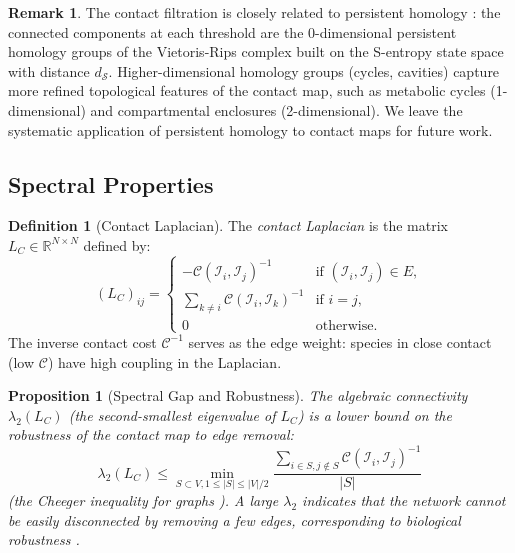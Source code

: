 \documentclass[11pt,twocolumn]{article}
\theoremstyle{plain}
\newtheorem{proposition}[theorem]{Proposition}
\theoremstyle{definition}
\newtheorem{definition}[theorem]{Definition}
\newtheorem{remark}[theorem]{Remark}
\newcommand{\CC}{\mathcal{C}}
\newcommand{\dS}{d_{\mathcal{S}}}
\newcommand{\reals}{\mathbb{R}}
\begin{document}
\begin{remark}
The contact filtration is closely related to persistent homology
\cite{edelsbrunner2008persistent, carlsson2009topology}: the connected
components at each threshold are the 0-dimensional persistent homology groups
of the Vietoris-Rips complex built on the S-entropy state space with distance
$\dS$. Higher-dimensional homology groups (cycles, cavities) capture more
refined topological features of the contact map, such as metabolic cycles
(1-dimensional) and compartmental enclosures (2-dimensional). We leave the
systematic application of persistent homology to contact maps for future work.
\end{remark}

\subsection{Spectral Properties}

\begin{definition}[Contact Laplacian]
\label{def:laplacian}
The \emph{contact Laplacian} is the matrix $L_C \in \reals^{N \times N}$
defined by:
\begin{equation}\label{eq:laplacian}
  (L_C)_{ij} =
  \begin{cases}
    -\CC(\mathcal{I}_i, \mathcal{I}_j)^{-1}
      & \text{if } (\mathcal{I}_i, \mathcal{I}_j) \in E, \\
    \sum_{k \neq i} \CC(\mathcal{I}_i, \mathcal{I}_k)^{-1}
      & \text{if } i = j, \\
    0 & \text{otherwise}.
  \end{cases}
\end{equation}
The inverse contact cost $\CC^{-1}$ serves as the edge weight: species in close
contact (low $\CC$) have high coupling in the Laplacian.
\end{definition}

\begin{proposition}[Spectral Gap and Robustness]
\label{prop:spectral_gap}
The algebraic connectivity $\lambda_2(L_C)$ (the second-smallest eigenvalue
of $L_C$) is a lower bound on the robustness of the contact map to edge
removal:
\begin{equation}
  \lambda_2(L_C)
  \leq \min_{S \subset V, 1 \leq |S| \leq |V|/2}
    \frac{\sum_{i \in S, j \notin S} \CC(\mathcal{I}_i, \mathcal{I}_j)^{-1}}
         {|S|}
\end{equation}
(the Cheeger inequality for graphs \cite{chung1997spectral}).
A large $\lambda_2$ indicates that the network cannot be easily disconnected
by removing a few edges, corresponding to biological robustness
\cite{albert2000error, kitano2004biological, stelling2004robustness}.
\end{proposition}
\end{document}
